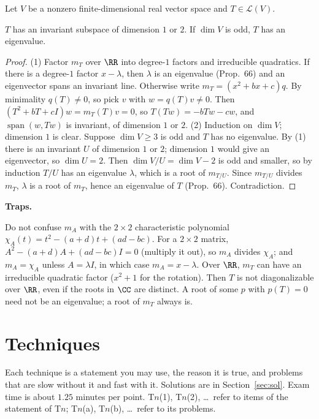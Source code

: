 \documentclass[10pt]{scrartcl}
\DeclareMathOperator{\spn}{span}
\newcommand{\LL}{\mathcal L}
\newcommand{\traps}{\par\medskip\noindent\textbf{\color{RawSienna}Traps.}\ }
\begin{document}
\begin{proposition*}
  Let $V$ be a nonzero finite-dimensional real vector space and $T\in\LL(V)$.
  \begin{enumerate}
    \ii $T$ has an invariant subspace of dimension $1$ or $2$.
    \ii If $\dim V$ is odd, $T$ has an eigenvalue.
  \end{enumerate}
\end{proposition*}
\begin{proof}
  (1) Factor $m_T$ over $\RR$ into degree-$1$ factors and irreducible quadratics. If there is a degree-$1$ factor $x-\lambda$, then $\lambda$ is an eigenvalue (Prop.~66) and an eigenvector spans an invariant line. Otherwise write $m_T=(x^2+bx+c)q$. By minimality $q(T)\ne0$, so pick $v$ with $w=q(T)v\ne0$. Then $(T^2+bT+cI)w=m_T(T)v=0$, so $T(Tw)=-bTw-cw$, and $\spn(w,Tw)$ is invariant, of dimension $1$ or $2$.
  (2) Induction on $\dim V$; dimension $1$ is clear. Suppose $\dim V\ge3$ is odd and $T$ has no eigenvalue. By (1) there is an invariant $U$ of dimension $1$ or $2$; dimension $1$ would give an eigenvector, so $\dim U=2$. Then $\dim V/U=\dim V-2$ is odd and smaller, so by induction $T/U$ has an eigenvalue $\lambda$, which is a root of $m_{T/U}$. Since $m_{T/U}$ divides $m_T$, $\lambda$ is a root of $m_T$, hence an eigenvalue of $T$ (Prop.~66). Contradiction.
\end{proof}

\traps
\begin{itemize}
  \ii Do not confuse $m_A$ with the $2\times2$ characteristic polynomial $\chi_A(t)=t^2-(a+d)t+(ad-bc)$. For a $2\times2$ matrix, $A^2-(a+d)A+(ad-bc)I=0$ (multiply it out), so $m_A$ divides $\chi_A$; and $m_A=\chi_A$ unless $A=\lambda I$, in which case $m_A=x-\lambda$.
  \ii Over $\RR$, $m_T$ can have an irreducible quadratic factor ($x^2+1$ for the rotation). Then $T$ is not diagonalizable over $\RR$, even if the roots in $\CC$ are distinct.
  \ii A root of some $p$ with $p(T)=0$ need not be an eigenvalue; a root of $m_T$ always is.
\end{itemize}

\clearpage
\section{Techniques}

Each technique is a statement you may use, the reason it is true, and problems that are slow without it and fast with it. Solutions are in Section~\ref{sec:sol}. Exam time is about $1.25$ minutes per point. T$n$(1), T$n$(2), \dots\ refer to items of the statement of T$n$; T$n$(a), T$n$(b), \dots\ refer to its problems.
\end{document}
